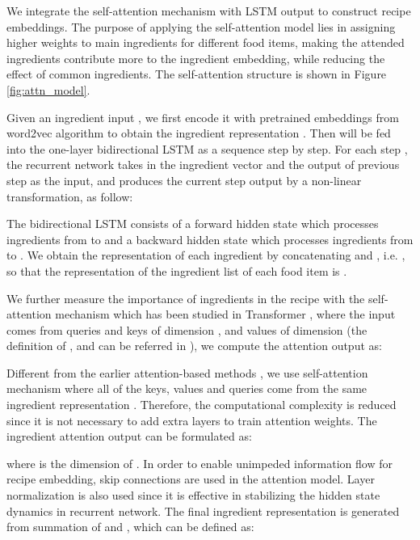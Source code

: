 \documentclass[journal]{IEEEtran}
\begin{document}
We integrate the self-attention mechanism with LSTM output to construct recipe embeddings. The purpose of applying the self-attention model lies in assigning higher weights to main ingredients for different food items, making the attended ingredients contribute more to the ingredient embedding, while reducing the effect of common ingredients. The self-attention structure is shown in Figure \ref{fig:attn_model}.


Given an ingredient input , we first encode it with pretrained embeddings from word2vec algorithm to obtain the ingredient representation . Then  will be fed into the one-layer bidirectional LSTM as a sequence step by step. For each step , the recurrent network takes in the ingredient vector  and the output of previous step  as the input, and produces the current step output  by a non-linear transformation, as follow:



The bidirectional LSTM consists of a forward hidden state  which processes ingredients from  to  and a backward hidden state  which processes ingredients from  to . We obtain the representation  of each ingredient  by concatenating  and , i.e. , so that the representation of the ingredient list of each food item is .

We further measure the importance of ingredients in the recipe with the self-attention mechanism which has been studied in Transformer \cite{vaswani2017attention}, where the input comes from queries  and keys  of dimension , and values  of dimension  (the definition of ,  and  can be referred in \cite{vaswani2017attention}), we compute the attention output as:



Different from the earlier attention-based methods \cite{chen2018deep}, we use self-attention mechanism where all of the keys, values and queries come from the same ingredient representation . Therefore, the computational complexity is reduced since it is not necessary to add extra layers to train attention weights. The ingredient attention output  can be formulated as:


where  is the dimension of . In order to enable unimpeded information flow for recipe embedding, skip connections are used in the attention model. Layer normalization \cite{ba2016layer} is also used since it is effective in stabilizing the hidden state dynamics in recurrent network. The final ingredient representation  is generated from summation of  and , which can be defined as:
\end{document}
